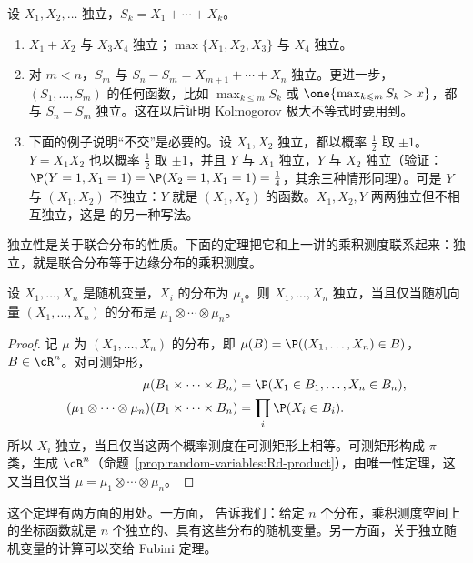 \begin{example}\label{ex:independence:grouping-examples}
设 $X_1,X_2,\dots$ 独立，$S_k=X_1+\cdots+X_k$。
\begin{enumerate}
\item $X_1+X_2$ 与 $X_3X_4$ 独立；$\max\{X_1,X_2,X_3\}$ 与 $X_4$ 独立。
\item 对 $m<n$，$S_m$ 与 $S_n-S_m=X_{m+1}+\cdots+X_n$ 独立。更进一步，$(S_1,\dots,S_m)$ 的任何函数，比如 $\max_{k\leqslant m}S_k$ 或 $\one\{\max_{k\leqslant m}S_k>x\}$，都与 $S_n-S_m$ 独立。这在以后证明 Kolmogorov 极大不等式时要用到。
\item 下面的例子说明“不交”是必要的。设 $X_1,X_2$ 独立，都以概率 $\frac12$ 取 $\pm1$。$Y=X_1X_2$ 也以概率 $\frac12$ 取 $\pm1$，并且 $Y$ 与 $X_1$ 独立，$Y$ 与 $X_2$ 独立（验证：$\P(Y=1,X_1=1)=\P(X_2=1,X_1=1)=\frac14$，其余三种情形同理）。可是 $Y$ 与 $(X_1,X_2)$ 不独立：$Y$ 就是 $(X_1,X_2)$ 的函数。$X_1,X_2,Y$ 两两独立但不相互独立，这是 的另一种写法。
\end{enumerate}
\end{example}


独立性是关于联合分布的性质。下面的定理把它和上一讲的乘积测度联系起来：独立，就是联合分布等于边缘分布的乘积测度。

\begin{theorem}[独立与乘积测度]\label{thm:independence:product-measure}
设 $X_1,\dots,X_n$ 是随机变量，$X_i$ 的分布为 $\mu_i$。则 $X_1,\dots,X_n$ 独立，当且仅当随机向量 $(X_1,\dots,X_n)$ 的分布是 $\mu_1\otimes\cdots\otimes\mu_n$。
\end{theorem}
\begin{proof}
记 $\mu$ 为 $(X_1,\dots,X_n)$ 的分布，即 $\mu(B)=\P((X_1,\dots,X_n)\in B)$，$B\in\cR^n$。对可测矩形，
\[
\begin{aligned}
\mu(B_1\times\cdots\times B_n)&=\P(X_1\in B_1,\dots,X_n\in B_n),\\
(\mu_1\otimes\cdots\otimes\mu_n)(B_1\times\cdots\times B_n)&=\prod_i\P(X_i\in B_i).
\end{aligned}
\]
所以 $X_i$ 独立，当且仅当这两个概率测度在可测矩形上相等。可测矩形构成 $\pi$-类，生成 $\cR^n$（命题~\ref{prop:random-variables:Rd-product}），由唯一性定理，这又当且仅当 $\mu=\mu_1\otimes\cdots\otimes\mu_n$。
\end{proof}

这个定理有两方面的用处。一方面， 告诉我们：给定 $n$ 个分布，乘积测度空间上的坐标函数就是 $n$ 个独立的、具有这些分布的随机变量。另一方面，关于独立随机变量的计算可以交给 Fubini 定理。

